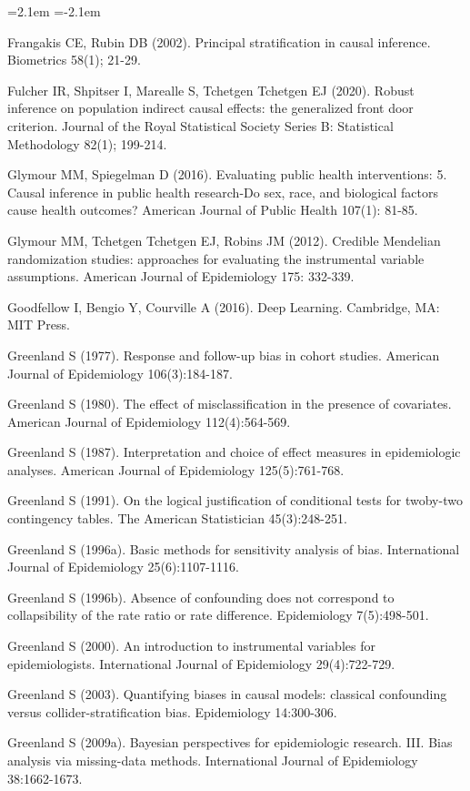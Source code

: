 \begin{list}{}{\leftmargin=2.1em   \itemindent=-2.1em \parsep=0pt \itemsep=1.6pt \topsep=4pt \rightmargin=0pt}
\item Frangakis CE, Rubin DB (2002). Principal stratification in causal inference. Biometrics 58(1); 21-29.
\item Fulcher IR, Shpitser I, Marealle S, Tchetgen Tchetgen EJ (2020). Robust inference on population indirect causal effects: the generalized front door criterion. Journal of the Royal Statistical Society Series B: Statistical Methodology 82(1); 199-214.
\item Glymour MM, Spiegelman D (2016). Evaluating public health interventions: 5. Causal inference in public health research-Do sex, race, and biological factors cause health outcomes? American Journal of Public Health 107(1): 81-85.
\item Glymour MM, Tchetgen Tchetgen EJ, Robins JM (2012). Credible Mendelian randomization studies: approaches for evaluating the instrumental variable assumptions. American Journal of Epidemiology 175: 332-339.
\item Goodfellow I, Bengio Y, Courville A (2016). Deep Learning. Cambridge, MA: MIT Press.
\item Greenland S (1977). Response and follow-up bias in cohort studies. American Journal of Epidemiology 106(3):184-187.
\item Greenland S (1980). The effect of misclassification in the presence of covariates. American Journal of Epidemiology 112(4):564-569.
\item Greenland S (1987). Interpretation and choice of effect measures in epidemiologic analyses. American Journal of Epidemiology 125(5):761-768.
\item Greenland S (1991). On the logical justification of conditional tests for twoby-two contingency tables. The American Statistician 45(3):248-251.
\item Greenland S (1996a). Basic methods for sensitivity analysis of bias. International Journal of Epidemiology 25(6):1107-1116.
\item Greenland S (1996b). Absence of confounding does not correspond to collapsibility of the rate ratio or rate difference. Epidemiology 7(5):498-501.
\item Greenland S (2000). An introduction to instrumental variables for epidemiologists. International Journal of Epidemiology 29(4):722-729.
\item Greenland S (2003). Quantifying biases in causal models: classical confounding versus collider-stratification bias. Epidemiology 14:300-306.
\item Greenland S (2009a). Bayesian perspectives for epidemiologic research. III. Bias analysis via missing-data methods. International Journal of Epidemiology 38:1662-1673.

\end{list}
